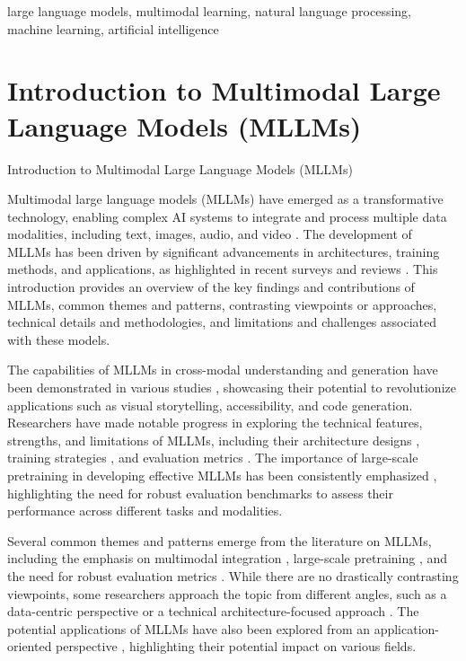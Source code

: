 \documentclass[conference]{IEEEtran}
\begin{document}
\begin{IEEEkeywords}
large language models, multimodal learning, natural language processing, machine learning, artificial intelligence
\end{IEEEkeywords}


\section{Introduction to Multimodal Large Language Models (MLLMs)}
Introduction to Multimodal Large Language Models (MLLMs)

Multimodal large language models (MLLMs) have emerged as a transformative technology, enabling complex AI systems to integrate and process multiple data modalities, including text, images, audio, and video \cite{b1}. The development of MLLMs has been driven by significant advancements in architectures, training methods, and applications, as highlighted in recent surveys and reviews \cite{b2, b3}. This introduction provides an overview of the key findings and contributions of MLLMs, common themes and patterns, contrasting viewpoints or approaches, technical details and methodologies, and limitations and challenges associated with these models.

The capabilities of MLLMs in cross-modal understanding and generation have been demonstrated in various studies \cite{b4, b5}, showcasing their potential to revolutionize applications such as visual storytelling, accessibility, and code generation. Researchers have made notable progress in exploring the technical features, strengths, and limitations of MLLMs, including their architecture designs \cite{b6}, training strategies \cite{b7}, and evaluation metrics \cite{b8}. The importance of large-scale pretraining in developing effective MLLMs has been consistently emphasized \cite{b9, b10}, highlighting the need for robust evaluation benchmarks to assess their performance across different tasks and modalities.

Several common themes and patterns emerge from the literature on MLLMs, including the emphasis on multimodal integration \cite{b11}, large-scale pretraining \cite{b12}, and the need for robust evaluation metrics \cite{b13}. While there are no drastically contrasting viewpoints, some researchers approach the topic from different angles, such as a data-centric perspective \cite{b14} or a technical architecture-focused approach \cite{b15}. The potential applications of MLLMs have also been explored from an application-oriented perspective \cite{b16}, highlighting their potential impact on various fields.
\end{document}
